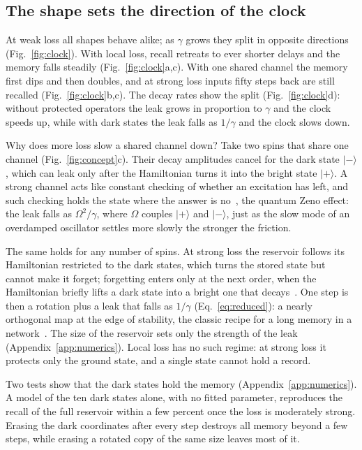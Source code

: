\subsection{The shape sets the direction of the clock}
\label{sec:clock}
At weak loss all shapes behave alike; as $\gamma$ grows they split in opposite directions (Fig.~\ref{fig:clock}).
With local loss, recall retreats to ever shorter delays and the memory falls steadily (Fig.~\ref{fig:clock}a,c). With
one shared channel the memory first dips and then doubles, and at strong loss inputs fifty steps back are still
recalled (Fig.~\ref{fig:clock}b,c). The decay rates show the split (Fig.~\ref{fig:clock}d): without protected
operators the leak grows in proportion to $\gamma$ and the clock speeds up, while with dark states the leak falls as
$1/\gamma$ and the clock slows down.

Why does more loss slow a shared channel down? Take two spins that share one channel (Fig.~\ref{fig:concept}c).
Their decay amplitudes cancel for the dark state $|{-}\rangle$, which can leak only after the Hamiltonian turns it into
the bright state $|{+}\rangle$. A strong channel acts like constant checking of whether an excitation has left, and
such checking holds the state where the answer is no~\cite{Beige2000,FacchiPascazio2002}, the quantum Zeno effect:
the leak falls as $\Omega^2/\gamma$, where $\Omega$ couples $|{+}\rangle$ and $|{-}\rangle$, just as the slow mode of
an overdamped oscillator settles more slowly the stronger the friction.

The same holds for any number of spins. At strong loss the reservoir follows its Hamiltonian restricted to the dark
states, which turns the stored state but cannot make it forget; forgetting enters only at the next order, when the
Hamiltonian briefly lifts a dark state into a bright one that decays~\cite{Zanardi2014,Reiter2012}. One step is then
a rotation plus a leak that falls as $1/\gamma$ (Eq.~\eqref{eq:reduced}): a nearly orthogonal map at the edge of
stability, the classic recipe for a long memory in a network~\cite{White2004}. The size of the reservoir sets only
the strength of the leak (Appendix~\ref{app:numerics}). Local loss has no such regime: at strong loss it protects only
the ground state, and a single state cannot hold a record.

Two tests show that the dark states hold the memory (Appendix~\ref{app:numerics}). A model of the ten dark states
alone, with no fitted parameter, reproduces the recall of the full reservoir within a few percent once the loss is
moderately strong. Erasing the dark coordinates after every step destroys all memory beyond a few steps, while erasing
a rotated copy of the same size leaves most of it.

